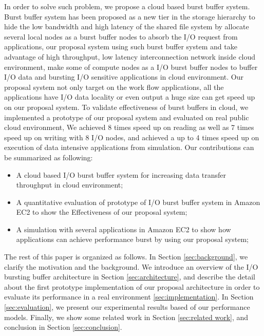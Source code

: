 In order to solve such problem, we propose a cloud based burst buffer system. Burst buffer system
has been proposed as a new tier in the storage hierarchy to hide the low bandwidth and high latency
of the shared file system by allocate several local nodes as a burst buffer nodes to absorb the I/O
request from applications, our proposal system using such burst buffer system and take advantage of
high throughput, low latency interconnection network inside cloud environment, make some of compute
nodes as a I/O burst buffer nodes to buffer I/O data and bursting I/O sensitive applications in cloud environment.
Our proposal system not only target on the work flow applications, all the
applications have I/O data locality or even output a huge size can get speed up on our proposal system.
To validate effectiveness of burst buffers in cloud, we implemented a prototype of our
proposal system and evaluated on real public cloud environment,
We achieved 8 times speed up on reading as well as 7 times speed up on writing with 8 I/O nodes, and
achieved a up to 4 times speed up on execution of data intensive applications from simulation.
Our contributions can be summarized as following:
\begin{itemize}
	\item A cloud based I/O burst buffer system for increasing data transfer throughput in cloud environment;
	\item A quantitative evaluation of prototype of I/O burst buffer system in Amazon EC2 to show the
	Effectiveness of our proposal system;
    \item A simulation with several applications in Amazon EC2 to show how applications can achieve
    performance burst by using our proposal system;
\end{itemize}

The rest of this paper is organized as follows. 
In Section \ref{sec:background}, we clarify the motivation and the background.
We introduce an overview of the I/O bursting buffer architecture in Section \ref{sec:architecture}, 
and describe the detail about the first prototype implementation of our proposal architecture in
order to evaluate its performance in a real environment \ref{sec:implementation}.
In Section \ref{sec:evaluation}, we present our experimental results based of our performance models.
Finally, we show some related work in Section \ref{sec:related work}, and conclusion in Section \ref{sec:conclusion}.
